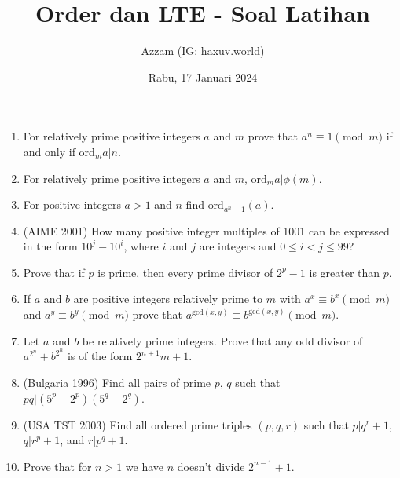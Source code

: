 \documentclass[11pt]{scrartcl}
\title{Order dan LTE - Soal Latihan}
\author{Azzam (IG: haxuv.world)}
\date{Rabu, 17 Januari 2024}
\begin{document}
\maketitle
\begin{enumerate}
    \item For relatively prime positive integers $a$ and $m$ prove that $a^n \equiv 1 \pmod{m}$ if and only if $\text{ord}_m a | n$.

    \item For relatively prime positive integers $a$ and $m$, $\text{ord}_m a | \phi(m)$.
    
    \item For positive integers $a > 1$ and $n$ find $\text{ord}_{a^n-1} (a)$.
    
    \item (AIME 2001) How many positive integer multiples of 1001 can be expressed in the form $10^j-10^i$, where $i$ and $j$ are integers and $0 \leq i < j \leq 99$?
    
    \item Prove that if $p$ is prime, then every prime divisor of $2^p-1$ is greater than $p$.
    
    
    \item If $a$ and $b$ are positive integers relatively prime to $m$ with $a^x \equiv b^x \pmod{m}$ and $a^y \equiv b^y \pmod{m}$ prove that $a^{\text{gcd}(x,y)} \equiv b^{\text{gcd}(x,y)} \pmod{m}$.
    
    \item Let $a$ and $b$ be relatively prime integers. Prove that any odd divisor of $a^{2^n}+b^{2^n}$ is of the form $2^{n+1}m +1$.
    
    \item (Bulgaria 1996) Find all pairs of prime $p$, $q$ such that $pq | (5^p - 2^p) (5^q - 2^q)$.
    
    \item (USA TST 2003) Find all ordered prime triples $(p, q, r)$ such that $p | q^r + 1$, $q | r^p + 1$, and $r | p^q + 1$.
    
    \item Prove that for $n > 1$ we have $n$ doesn't divide $2^{n-1} + 1$.
    
    

\end{enumerate}
\end{document}

